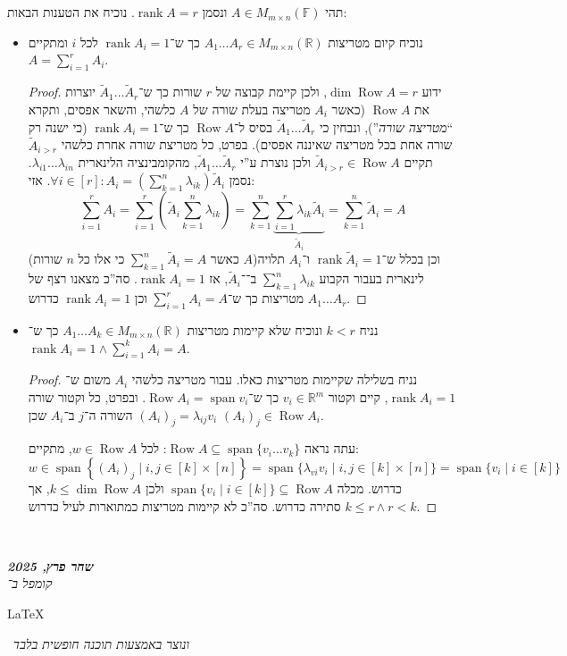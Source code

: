 \documentclass[]{article}
\newcommand\en[1] {\begin{otherlanguage}{english}#1\end{otherlanguage}}
\newcommand\ndoc  {\dotfill \\ \vfil {\begin{center}
            {\textbf{\textit{שחר פרץ, 2025}} \\
                \scriptsize \textit{קומפל ב־}\en{\LaTeX}\,\textit{ ונוצר באמצעות תוכנה חופשית בלבד}}
    \end{center}} \vfil	}
\newcommand\R     {\mathbb{R}}
\DeclareMathOperator{\Sp}     {span}
\DeclareMathOperator{\row}    {Row}
\DeclareMathOperator{\rk}     {rank}
\newcommand\sumnko    {\sum_{k = 1}^{n}}
\newcommand\F         {\mathbb{F}}
\newcommand\co        {\colon}
\newcommand\mat[2]    {M_{#1\times#2}}
\renewcommand\lg      {\lambda}
\newcommand\tl    {\tilde}
\newcommand\cl [1]    {\left ( #1 \right )}
\newcommand\ccb[1]    {\left \{ #1 \right \}}
\theoremstyle{definition}
\begin{document}
    \section{}
    תהי $A \in \mat{m}{n}(\F)$ ונסמן $\rk A = r$. נוכיח את הטענות הבאות: 
    \begin{itemize}
        \item נוכיח קיום מטריצות $A_1 \dots A_r \in \mat{m}{n}(\R)$ כך ש־$\rk A_i = 1$ לכל $i$ ומתקיים $A = \sum_{i = 1}^{r}A_i$. \begin{proof}
            ידוע $\dim \row A = r$, ולכן קיימת קבוצה של $r$ שורות כך ש־$\tl A_1 \dots \tl A_r$ יוצרות את $\row A$ (כאשר $A_i$ מטריצה בעלת שורה של $A$ כלשהי, והשאר אפסים, ותקרא ``\textit{מטריצה שורה}''), ונבחין כי $\tl A_1 \dots \tl A_r$ בסיס ל־$\row A$ כך ש־$\rk A_i = 1$ (כי ישנה רק שורה אחת בכל מטריצה שאיננה אפסים). בפרט, כל מטריצת שורה אחרת כלשהי $\tl A_{i > r}$ תקיים $\tl A_{i > r} \in \row A$ ולכן נוצרת ע''י $\tl A_1 \dots \tl A_r$, מהקומבינציה הלינארית $\lg_{i1} \dots \lg_{in}$. נסמן $\forall i \in [r] \co A_i = (\sumnko \lg_{ik})\tl A_i$. אזי: 
            \[ \sum_{i = 1}^r A_i = \sum_{i = 1}^{r}\cl{\tl A_i \sumnko\lg_{ik}} = \sumnko\underbrace{\sum_{i = 1}^{r}\lg_{ik}\tl A_i}_{\tl A_i} = \sumnko \tl A_i = A \]
            (כאשר $\sumnko \tl A_i = A$ כי אלו כל $n$ שורות $A$)וכן בכלל ש־$\rk \tl A_i = 1$ ו־$A_i$ תלויה לינארית בעבור הקבוע $\sumnko \lg_{ik}$ ב־־$\tl A_i$, אז $\rk A_i = 1$. סה''כ מצאנו רצף של $A_1 \dots A_r$ מטריצות כך ש־$\sum_{i = 1}^{r} A_i = A$ וכן $\rk A_i = 1$ כדרוש. 
        \end{proof}
        \item נניח $k < r$ ונוכיח שלא קיימות מטריצות $A_1 \dots A_k \in M_{m \times n}(\R)$ כך ש־$\rk A_i = 1 \land \sum_{i = 1}^{k}A_i = A$. \begin{proof}
            נניח בשלילה שקיימות מטריצות כאלו. עבור מטריצה כלשהי $A_i$ משום ש־$\rk A_i = 1$, קיים וקטור $v_i \in \R^m$ כך ש־$\row A_i = \Sp v_i$. ובפרט, כל וקטור שורה $(A_i)_j = \lg_{ij}v_i$ השורה ה־$j$ ב־$A_i$ שכן $(A_i)_j \in \row A_i$. 
            
            עתה נראה $\row A \subseteq \Sp\{v_i \dots v_k\}$: לכל $w \in \row A$, מתקיים:
            \[ w \in \Sp \ccb{{(A_{i})_j} \mid i, j \in [k] \times [n]} = \Sp\{\lg_{vi} v_i \mid i, j \in [k] \times [n]\} = \Sp\{v_i \mid i \in [k]\} \]
            כדרוש. מכלה $\Sp\{v_i \mid i \in [k]\} \subseteq \row A$ ולכן $k \le \dim\row A$, אך $k \le r \land r < k$ סתירה כדרוש. סה''כ לא קיימות מטריצות כמתוארות לעיל כדרוש. 
        \end{proof}
    \end{itemize}
    
    
    
    
    
    \ndoc
\end{document}
